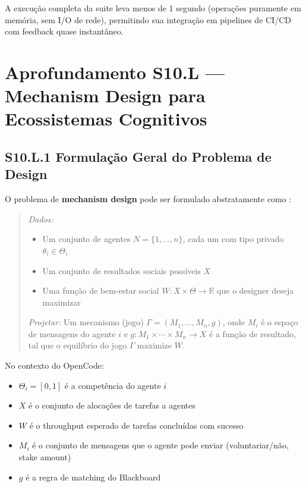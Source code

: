 A execução completa da suite leva menos de 1 segundo (operações puramente em memória, sem I/O de rede), permitindo sua integração em pipelines de CI/CD com feedback quase instantâneo.


\section*{Aprofundamento S10.L --- Mechanism Design para Ecossistemas Cognitivos}

\subsection*{S10.L.1 Formulação Geral do Problema de Design}

O problema de \textbf{mechanism design} pode ser formulado abstratamente como \cite{myerson1981optimal, hurwicz1973resource}:

\begin{quote}
\textit{Dados:}
\begin{itemize}
    \item Um conjunto de agentes $N = \{1, \ldots, n\}$, cada um com tipo privado $\theta_i \in \Theta_i$
    \item Um conjunto de resultados sociais possíveis $X$
    \item Uma função de bem-estar social $W: X \times \Theta \to \mathbb{R}$ que o designer deseja maximizar
\end{itemize}
\textit{Projetar:} Um mecanismo (jogo) $\Gamma = (M_1, \ldots, M_n, g)$, onde $M_i$ é o espaço de mensagens do agente $i$ e $g: M_1 \times \cdots \times M_n \to X$ é a função de resultado, tal que o equilíbrio do jogo $\Gamma$ maximize $W$.
\end{quote}

No contexto do OpenCode:
\begin{itemize}
    \item $\Theta_i = [0,1]$ é a competência do agente $i$
    \item $X$ é o conjunto de alocações de tarefas a agentes
    \item $W$ é o throughput esperado de tarefas concluídas com sucesso
    \item $M_i$ é o conjunto de mensagens que o agente pode enviar (voluntariar/não, stake amount)
    \item $g$ é a regra de matching do Blackboard
\end{itemize}

